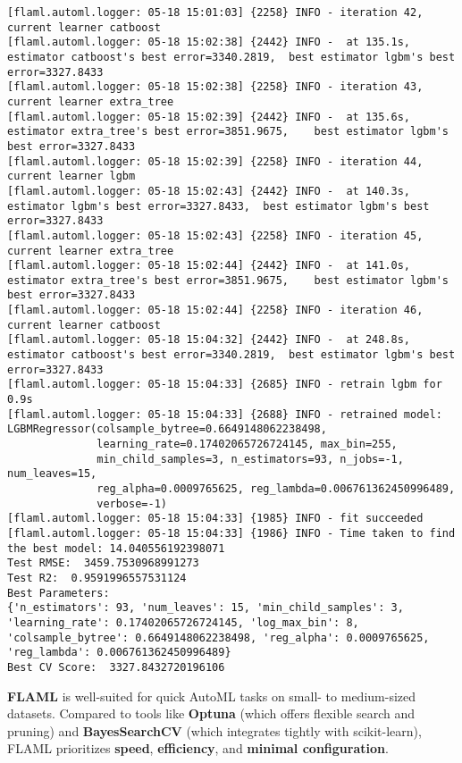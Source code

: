 \documentclass[
  letterpaper,
  DIV=11,
  numbers=noendperiod]{scrreprt}
\begin{document}
\begin{verbatim}
[flaml.automl.logger: 05-18 15:01:03] {2258} INFO - iteration 42, current learner catboost
[flaml.automl.logger: 05-18 15:02:38] {2442} INFO -  at 135.1s, estimator catboost's best error=3340.2819,  best estimator lgbm's best error=3327.8433
[flaml.automl.logger: 05-18 15:02:38] {2258} INFO - iteration 43, current learner extra_tree
[flaml.automl.logger: 05-18 15:02:39] {2442} INFO -  at 135.6s, estimator extra_tree's best error=3851.9675,    best estimator lgbm's best error=3327.8433
[flaml.automl.logger: 05-18 15:02:39] {2258} INFO - iteration 44, current learner lgbm
[flaml.automl.logger: 05-18 15:02:43] {2442} INFO -  at 140.3s, estimator lgbm's best error=3327.8433,  best estimator lgbm's best error=3327.8433
[flaml.automl.logger: 05-18 15:02:43] {2258} INFO - iteration 45, current learner extra_tree
[flaml.automl.logger: 05-18 15:02:44] {2442} INFO -  at 141.0s, estimator extra_tree's best error=3851.9675,    best estimator lgbm's best error=3327.8433
[flaml.automl.logger: 05-18 15:02:44] {2258} INFO - iteration 46, current learner catboost
[flaml.automl.logger: 05-18 15:04:32] {2442} INFO -  at 248.8s, estimator catboost's best error=3340.2819,  best estimator lgbm's best error=3327.8433
[flaml.automl.logger: 05-18 15:04:33] {2685} INFO - retrain lgbm for 0.9s
[flaml.automl.logger: 05-18 15:04:33] {2688} INFO - retrained model: LGBMRegressor(colsample_bytree=0.6649148062238498,
              learning_rate=0.17402065726724145, max_bin=255,
              min_child_samples=3, n_estimators=93, n_jobs=-1, num_leaves=15,
              reg_alpha=0.0009765625, reg_lambda=0.006761362450996489,
              verbose=-1)
[flaml.automl.logger: 05-18 15:04:33] {1985} INFO - fit succeeded
[flaml.automl.logger: 05-18 15:04:33] {1986} INFO - Time taken to find the best model: 14.040556192398071
Test RMSE:  3459.7530968991273
Test R2:  0.9591996557531124
Best Parameters: 
{'n_estimators': 93, 'num_leaves': 15, 'min_child_samples': 3, 'learning_rate': 0.17402065726724145, 'log_max_bin': 8, 'colsample_bytree': 0.6649148062238498, 'reg_alpha': 0.0009765625, 'reg_lambda': 0.006761362450996489}
Best CV Score:  3327.8432720196106
\end{verbatim}

\textbf{FLAML} is well-suited for quick AutoML tasks on small- to
medium-sized datasets. Compared to tools like \textbf{Optuna} (which
offers flexible search and pruning) and \textbf{BayesSearchCV} (which
integrates tightly with scikit-learn), FLAML prioritizes \textbf{speed},
\textbf{efficiency}, and \textbf{minimal configuration}.
\end{document}
